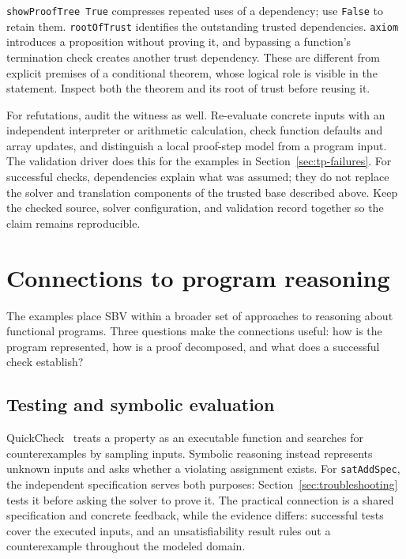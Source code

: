 \documentclass[review]{jfp-epi}
\newcommand{\code}[1]{\texttt{#1}}
\begin{document}
\code{showProofTree True} compresses repeated uses of a dependency; use
\code{False} to retain them. \code{rootOfTrust} identifies the outstanding
trusted dependencies. \code{axiom} introduces a proposition without proving it,
and bypassing a function's termination check creates another trust dependency.
These are different from explicit premises of a conditional theorem, whose
logical role is visible in the statement. Inspect both the theorem and its
root of trust before reusing it.

For refutations, audit the witness as well. Re-evaluate concrete inputs with an
independent interpreter or arithmetic calculation, check function defaults and
array updates, and distinguish a local proof-step model from a program input.
The validation driver does this for the examples in Section~\ref{sec:tp-failures}.
For successful checks, dependencies explain what was assumed; they do not
replace the solver and translation components of the trusted base described
above. Keep the checked source, solver configuration, and validation record
together so the claim remains reproducible.


\section{Connections to program reasoning}
\label{sec:related}

The examples place SBV within a broader set of approaches to reasoning about
functional programs. Three questions make the connections useful: how is the
program represented, how is a proof decomposed, and what does a successful check
establish?

\subsection{Testing and symbolic evaluation}

QuickCheck~\citep{quickcheck} treats a property as an executable function and
searches for counterexamples by sampling inputs. Symbolic reasoning instead
represents unknown inputs and asks whether a violating assignment exists.
For \code{satAddSpec}, the independent specification serves both purposes:
Section~\ref{sec:troubleshooting} tests it before asking the solver to prove it.
The practical connection is a shared specification and concrete feedback, while
the evidence differs: successful tests cover the executed inputs, and an
unsatisfiability result rules out a counterexample throughout the modeled domain.
\end{document}

